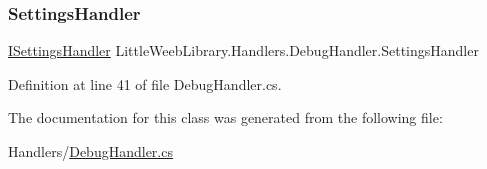 \subsubsection{\texorpdfstring{Settings\+Handler}{SettingsHandler}}
{\footnotesize\ttfamily \mbox{\hyperlink{interface_little_weeb_library_1_1_handlers_1_1_i_settings_handler}{I\+Settings\+Handler}} Little\+Weeb\+Library.\+Handlers.\+Debug\+Handler.\+Settings\+Handler\hspace{0.3cm}{\ttfamily [private]}}



Definition at line 41 of file Debug\+Handler.\+cs.



The documentation for this class was generated from the following file\+:\begin{DoxyCompactItemize}
\item 
Handlers/\mbox{\hyperlink{_debug_handler_8cs}{Debug\+Handler.\+cs}}\end{DoxyCompactItemize}
